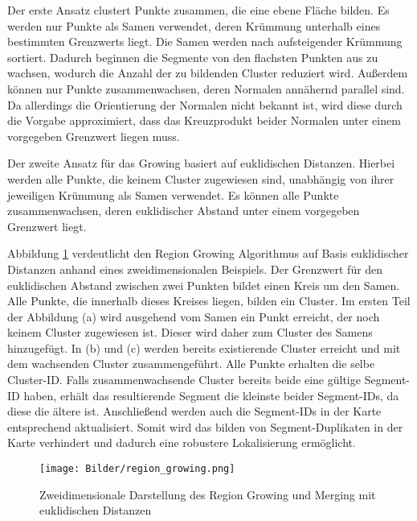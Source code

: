 Der erste Ansatz clustert Punkte zusammen, die eine ebene Fläche bilden. Es werden nur Punkte als Samen verwendet, deren Krümmung unterhalb eines bestimmten Grenzwerts liegt. Die Samen werden nach aufsteigender Krümmung sortiert. Dadurch beginnen die Segmente von den flachsten Punkten aus zu wachsen, wodurch die Anzahl der zu bildenden Cluster reduziert wird. Außerdem können nur Punkte zusammenwachsen, deren Normalen annähernd parallel sind. Da allerdings die Orientierung der Normalen nicht bekannt ist, wird diese durch die Vorgabe approximiert, dass das Kreuzprodukt beider Normalen unter einem vorgegeben Grenzwert liegen muss. 

Der zweite Ansatz für das Growing basiert auf euklidischen Distanzen. Hierbei werden alle Punkte, die keinem Cluster zugewiesen sind, unabhängig von ihrer jeweiligen Krümmung als Samen verwendet. Es können alle Punkte zusammenwachsen, deren euklidischer Abstand unter einem vorgegeben Grenzwert liegt.

Abbildung \ref{fig:cluster_merging} verdeutlicht den Region Growing Algorithmus auf Basis euklidischer Distanzen anhand eines zweidimensionalen Beispiels. Der Grenzwert für den eu\-kli\-disch\-en Abstand zwischen zwei Punkten bildet einen Kreis um den Samen. Alle Punkte, die innerhalb dieses Kreises liegen, bilden ein Cluster. Im ersten Teil der Abbildung (a) wird ausgehend vom Samen ein Punkt erreicht, der noch keinem Cluster zugewiesen ist. Dieser wird daher zum Cluster des Samens hinzugefügt. In (b) und (c) werden bereits existierende Cluster erreicht und mit dem wachsenden Cluster zusammengeführt. Alle Punkte erhalten die selbe Cluster-ID. Falls zusammenwachsende Cluster bereits beide eine gültige Segment-ID haben, erhält das resultierende Segment die kleinste beider Segment-IDs, da diese die ältere ist. Anschließend werden auch die Segment-IDs in der Karte entsprechend aktualisiert. Somit wird das bilden von Segment-Duplikaten in der Karte verhindert und dadurch eine robustere Lokalisierung ermöglicht. 

\begin{figure}
    \centering
    \texttt{[image: Bilder/region\_growing.png]}
    \caption{Zweidimensionale Darstellung des Region Growing und Merging mit euklidischen Distanzen \cite{Dube2018}}
    \label{fig:cluster_merging}
\end{figure}


